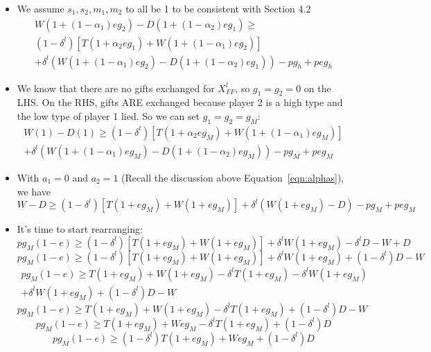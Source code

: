 \documentclass[12pt]{article}
\newcommand{\al}{\alpha}
\newcommand{\de}{\delta}
\begin{document}
	\begin{itemize}
		\item We assume $s_1,s_2,m_1,m_2$ to all be 1 to be consistent with Section 4.2
			\begin{multline*}
				W\left(1 + \left(1-\al_1\right)eg_2\right)-D\left(1 + \left(1-\al_2\right)eg_1\right) \geq \\
			\left(1-\de^l\right) \left[T\left(1 + \al_2eg_1\right) + W\left(1 + \left(1-\al_1\right)eg_2\right) \right] \\
			+ \de^l \left(W\left(1 + \left(1-\al_1\right)eg_2\right)-D\left(1 + \left(1-\al_2\right)eg_1\right)\right) -pg_h+peg_h
			\end{multline*}
		\item We know that there are no gifts exchanged for $X^l_{FF}$, so $g_1 = g_2 = 0$ on the LHS. On the RHS, gifts ARE exchanged because player 2 is a high type and the low type of player 1 lied. So we can set $g_1 = g_2 = g_M$:
			\begin{multline*}
				W\left(1 \right)-D\left(1 \right) \geq
			\left(1-\de^l\right) \left[T\left(1 + \al_2eg_M\right) + W\left(1 + \left(1-\al_1\right)eg_M\right) \right] \\
			+ \de^l \left(W\left(1 + \left(1-\al_1\right)eg_M\right)-D\left(1 + \left(1-\al_2\right)eg_M\right)\right) -pg_M+peg_M
			\end{multline*}
		\item With $a_1 = 0$ and $a_2 = 1$ (Recall the discussion above Equation~\ref{eqn:alphas}), we have
			\[
				W - D \geq \left(1-\de^l\right) \left[T\left(1 + eg_M\right) + W\left(1 + eg_M\right) \right] 
			+ \de^l \left(W\left(1 + eg_M\right) - D\right) -pg_M+peg_M
			\]
		\item It's time to start rearranging:
			\[
				pg_M\left(1 - e\right) \geq \left(1-\de^l\right) \left[T\left(1 + eg_M\right) + W\left(1 + eg_M\right) \right] 
			+ \de^l W\left(1 + eg_M\right) - \de^l D - W + D
			\]
			\[
				pg_M\left(1 - e\right) \geq \left(1-\de^l\right) \left[T\left(1 + eg_M\right) + W\left(1 + eg_M\right) \right] 
			+ \de^l W\left(1 + eg_M\right) + \left(1 - \de^l\right) D - W
			\]
			\begin{multline*}
			  	pg_M\left(1 - e\right) \geq T\left(1 + eg_M\right) + W\left(1 + eg_M\right) -\de^l T\left(1 + eg_M\right) -\de^l W\left(1 + eg_M\right) \\
			+ \de^l W\left(1 + eg_M\right) + \left(1 - \de^l\right) D - W
			\end{multline*}
			\[
				pg_M\left(1 - e\right) \geq T\left(1 + eg_M\right) + W\left(1 + eg_M\right) -\de^l T\left(1 + eg_M\right) + \left(1 - \de^l\right) D - W
			\]
			\[
				pg_M\left(1 - e\right) \geq T\left(1 + eg_M\right) + Weg_M -\de^l T\left(1 + eg_M\right) + \left(1 - \de^l\right) D
			\]
			\begin{equation}
				pg_M\left(1 - e\right) \geq \left(1 - \de^l\right) T\left(1 + eg_M\right) + Weg_M + \left(1 - \de^l\right) D
				\label{eq:examine}
			\end{equation}
	\end{itemize}
\end{document}
